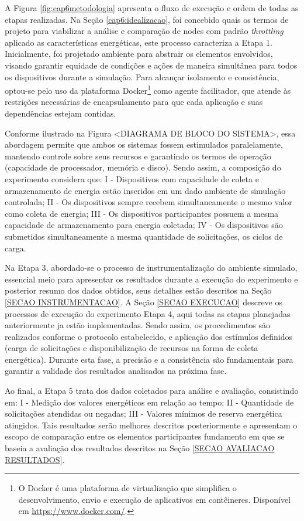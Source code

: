 A Figura \ref{fig:cap6metodologia} apresenta o fluxo de execução e ordem de todas as etapas realizadas. Na Seção \ref{cap6:idealizacao}, foi concebido quais os termos de projeto para viabilizar a análise e comparação de nodes com padrão \textit{throttling} aplicado as características energéticas, este processo caracteriza a Etapa 1. Inicialmente, foi projetado ambiente para abstrair os elementos envolvidos, visando garantir equidade de condições e ações de maneira simultânea para todos os dispositivos durante a simulação. Para alcançar isolamento e consistência, optou-se pelo uso da plataforma Docker\footnote{O Docker é uma plataforma de virtualização que simplifica o desenvolvimento, envio e execução de aplicativos em contêineres. Disponível em \url{https://www.docker.com/}.} como agente facilitador, que atende às restrições necessárias de encapsulamento para que cada aplicação e suas dependências estejam contidas. 

Conforme ilustrado na Figura <DIAGRAMA DE BLOCO DO SISTEMA>, essa abordagem permite que ambos os sistemas fossem estimulados paralelamente, mantendo controle sobre seus recursos e garantindo os termos de operação (capacidade de processador, memória e disco). Sendo assim, a composição do experimento considera que:  I - Dispositivos com capacidade de coleta e armazenamento de energia estão inseridos em um dado ambiente de simulação controlada; II - Os dispositivos sempre recebem simultaneamente o mesmo valor como coleta de energia; III - Os dispositivos participantes possuem a mesma capacidade de armazenamento para energia coletada; IV - Os dispositivos são submetidos simultaneamente a mesma quantidade de solicitações, os ciclos de carga.

Na Etapa 3, abordado-se o processo de instrumentalização do ambiente simulado, essencial meio para apresentar os resultados durante a execução do experimento e posterior resumo dos dados obtidos, seus detalhes estão descritos na Seção \ref{SECAO INSTRUMENTACAO}. A Seção \ref{SECAO EXECUCAO} descreve os processos de execução do experimento Etapa 4, aqui todas as etapas planejadas anteriormente ja estão implementadas. Sendo assim, os procedimentos são realizados conforme o protocolo estabelecido, e aplicação dos estímulos definidos  (carga de solicitações e disponibilização de recursos na forma de coleta energética). Durante esta fase, a precisão e a consistência são fundamentais para garantir a validade dos resultados analisados na próxima fase. 

Ao final, a Etapa 5 trata dos dados coletados para análise e avaliação,
consistindo em: I - Medição dos valores energéticos em relação ao tempo; II - Quantidade de solicitações atendidas ou negadas; III - Valores mínimos de reserva energética atingidos. Tais resultados serão melhores descritos posteriormente e apresentam o escopo de comparação entre os elementos participantes fundamento em que se baseia a avaliação dos resultados descritos na Seção \ref{SECAO AVALIACAO RESULTADOS}.

